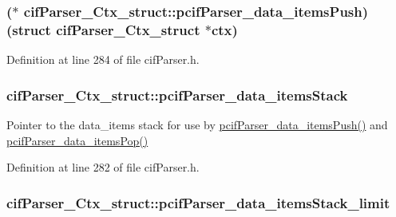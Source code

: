 \hypertarget{structcif_parser___ctx__struct_a5e1e7b3ca652931cbefae87dac602880}{
\subsubsection[{pcif\-Parser\-\_\-data\-\_\-items\-Push}]{($\ast$ cif\-Parser\-\_\-\-Ctx\-\_\-struct\-::pcif\-Parser\-\_\-data\-\_\-items\-Push)(struct {\bf cif\-Parser\-\_\-\-Ctx\-\_\-struct} $\ast$ctx)}}\label{structcif_parser___ctx__struct_a5e1e7b3ca652931cbefae87dac602880}


Definition at line 284 of file cif\-Parser.\-h.

\hypertarget{structcif_parser___ctx__struct_a64dda8029ad03eabf86c438584381765}{
\subsubsection[{pcif\-Parser\-\_\-data\-\_\-items\-Stack}]{ cif\-Parser\-\_\-\-Ctx\-\_\-struct\-::pcif\-Parser\-\_\-data\-\_\-items\-Stack}}\label{structcif_parser___ctx__struct_a64dda8029ad03eabf86c438584381765}
Pointer to the data\-\_\-items stack for use by \hyperlink{structcif_parser___ctx__struct_a5e1e7b3ca652931cbefae87dac602880}{pcif\-Parser\-\_\-data\-\_\-items\-Push()} and \hyperlink{cif_parser_8cpp_ac6aa8d2568997b2a0b588bb025b3126f}{pcif\-Parser\-\_\-data\-\_\-items\-Pop()} 

Definition at line 282 of file cif\-Parser.\-h.

\hypertarget{structcif_parser___ctx__struct_a1ce1786320c2615b35585ddedebf1fd3}{
\subsubsection[{pcif\-Parser\-\_\-data\-\_\-items\-Stack\-\_\-limit}]{ cif\-Parser\-\_\-\-Ctx\-\_\-struct\-::pcif\-Parser\-\_\-data\-\_\-items\-Stack\-\_\-limit}}\label{structcif_parser___ctx__struct_a1ce1786320c2615b35585ddedebf1fd3}


